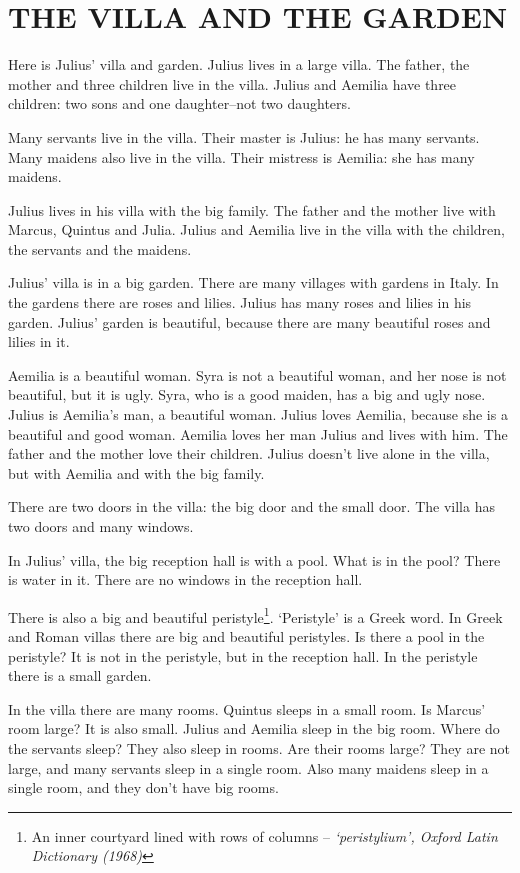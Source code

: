 
\chapter{THE VILLA AND THE GARDEN}

\linenumbers[1]

Here is Julius' villa and garden. Julius lives in a large villa. The father, the mother and three children live in the villa. Julius and Aemilia have three children: two sons and one daughter--not two daughters.

Many servants live in the villa. Their master is Julius: he has many servants. Many maidens also live in the villa. Their mistress is Aemilia: she has many maidens.

Julius lives in his villa with the big family. The father and the mother live with Marcus, Quintus and Julia. Julius and Aemilia live in the villa with the children, the servants and the maidens.

Julius' villa is in a big garden. There are many villages with gardens in Italy. In the gardens there are roses and lilies. Julius has many roses and lilies in his garden. Julius' garden is beautiful, because there are many beautiful roses and lilies in it.

Aemilia is a beautiful woman. Syra is not a beautiful woman, and her nose is not beautiful, but it is ugly. Syra, who is a good maiden, has a big and ugly nose. Julius is Aemilia's man, a beautiful woman. Julius loves Aemilia, because she is a beautiful and good woman. Aemilia loves her man Julius and lives with him. The father and the mother love their children. Julius doesn't live alone in the villa, but with Aemilia and with the big family.

There are two doors in the villa: the big door and the small door. The villa has two doors and many windows.

In Julius' villa, the big reception hall is with a pool. What is in the pool? There is water in it. There are no windows in the reception hall.

There is also a big and beautiful peristyle\footnote{An inner courtyard lined with rows of columns -- \emph{`peristylium', Oxford Latin Dictionary (1968)}}. `Peristyle' is a Greek word. In Greek and Roman villas there are big and beautiful peristyles. Is there a pool in the peristyle? It is not in the peristyle, but in the reception hall. In the peristyle there is a small garden.

In the villa there are many rooms. Quintus sleeps in a small room. Is Marcus' room large? It is also small. Julius and Aemilia sleep in the big room. Where do the servants sleep? They also sleep in rooms. Are their rooms large? They are not large, and many servants sleep in a single room. Also many maidens sleep in a single room, and they don't have big rooms.


